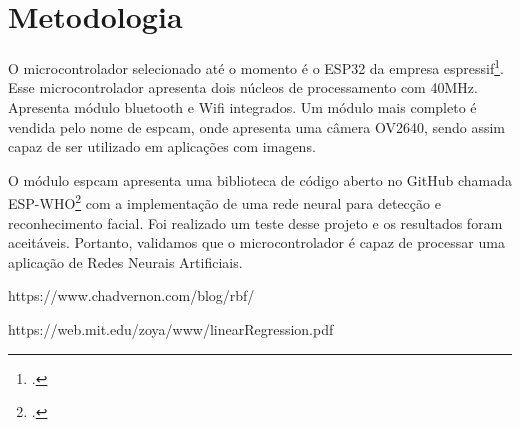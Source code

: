 \section{Metodologia}

O microcontrolador selecionado até o momento é o ESP32 da empresa espressif\footcite{espressif.com}. Esse microcontrolador
apresenta dois núcleos de processamento com 40MHz. Apresenta módulo bluetooth e Wifi integrados.
Um módulo mais completo é vendida pelo nome de espcam, onde apresenta uma câmera OV2640,
sendo assim capaz de ser utilizado em aplicações com imagens. 

O módulo espcam apresenta uma biblioteca de código aberto no GitHub chamada ESP-WHO\footcite{ESP-WHO: https://github.com/espressif/esp-who}
com a implementação de uma rede neural para detecção e reconhecimento facial. Foi realizado um teste desse projeto
e os resultados foram aceitáveis. Portanto, validamos que o microcontrolador é capaz de processar uma aplicação de Redes Neurais Artificiais.



https://www.chadvernon.com/blog/rbf/

https://web.mit.edu/zoya/www/linearRegression.pdf
